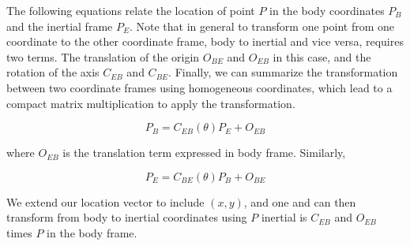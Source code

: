 The following equations relate the location of point $P$ in the body coordinates $P_B$ and the inertial frame $P_E$. 
Note that in general to transform one point from one coordinate to the other coordinate frame, body to inertial and vice versa, requires two terms. The translation of the origin $O_{BE}$ and $O_{EB}$ in this case, and the rotation of the axis $C_{EB}$ and $C_{BE}$. Finally, we can summarize the transformation between two coordinate frames using homogeneous coordinates, which lead to a compact matrix multiplication to apply the transformation. 

\begin{equation}
P_B = C_{EB}(\theta)P_E + O_{EB}
\end{equation}

where $O_{EB}$ is the translation term expressed in body frame. Similarly,

\begin{equation}
P_E = C_{BE}(\theta)P_B + O_{BE}
\end{equation}


We extend our location vector to include $(x, y)$, and one and can then transform from body to inertial coordinates using $P$ inertial is $C_{EB}$ and $O_{EB}$ times $P$ in the body frame. 


